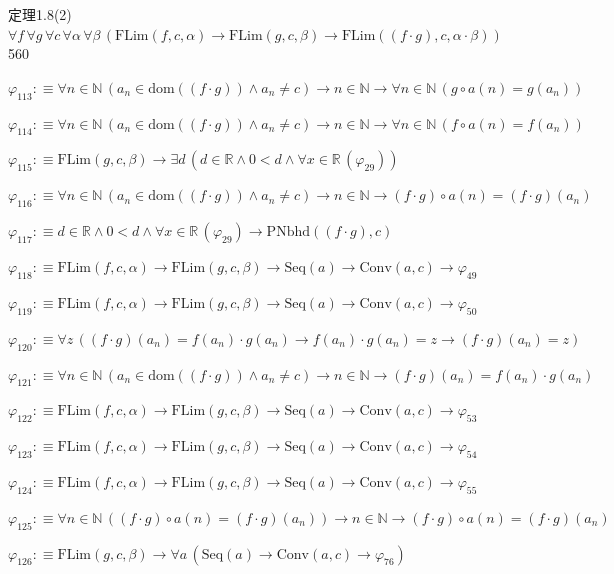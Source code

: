 \begin{fullproof}{定理1.8(2)}{$\forall f\,\forall g\,\forall c\,\forall \alpha\,\forall \beta\,(\mathrm{FLim}(f,c,\alpha) \to \mathrm{FLim}(g,c,\beta) \to \mathrm{FLim}((f \cdot g),c,\alpha \cdot \beta))$}{560}
\begin{abbrevlist}
\item $\varphi_{113} :\equiv \forall n \in \mathbb{N}\,(a_{n} \in \mathrm{dom}((f \cdot g)) \land a_{n} \neq c) \to n \in \mathbb{N} \to \forall n \in \mathbb{N}\,(g \circ a(n) = g(a_{n}))$
\item $\varphi_{114} :\equiv \forall n \in \mathbb{N}\,(a_{n} \in \mathrm{dom}((f \cdot g)) \land a_{n} \neq c) \to n \in \mathbb{N} \to \forall n \in \mathbb{N}\,(f \circ a(n) = f(a_{n}))$
\item $\varphi_{115} :\equiv \mathrm{FLim}(g,c,\beta) \to \exists d\,(d \in \mathbb{R} \land 0 < d \land \forall x \in \mathbb{R}\,(\varphi_{29}))$
\item $\varphi_{116} :\equiv \forall n \in \mathbb{N}\,(a_{n} \in \mathrm{dom}((f \cdot g)) \land a_{n} \neq c) \to n \in \mathbb{N} \to (f \cdot g) \circ a(n) = (f \cdot g)(a_{n})$
\item $\varphi_{117} :\equiv d \in \mathbb{R} \land 0 < d \land \forall x \in \mathbb{R}\,(\varphi_{29}) \to \mathrm{PNbhd}((f \cdot g),c)$
\item $\varphi_{118} :\equiv \mathrm{FLim}(f,c,\alpha) \to \mathrm{FLim}(g,c,\beta) \to \mathrm{Seq}(a) \to \mathrm{Conv}(a,c) \to \varphi_{49}$
\item $\varphi_{119} :\equiv \mathrm{FLim}(f,c,\alpha) \to \mathrm{FLim}(g,c,\beta) \to \mathrm{Seq}(a) \to \mathrm{Conv}(a,c) \to \varphi_{50}$
\item $\varphi_{120} :\equiv \forall z\,((f \cdot g)(a_{n}) = f(a_{n}) \cdot g(a_{n}) \to f(a_{n}) \cdot g(a_{n}) = z \to (f \cdot g)(a_{n}) = z)$
\item $\varphi_{121} :\equiv \forall n \in \mathbb{N}\,(a_{n} \in \mathrm{dom}((f \cdot g)) \land a_{n} \neq c) \to n \in \mathbb{N} \to (f \cdot g)(a_{n}) = f(a_{n}) \cdot g(a_{n})$
\item $\varphi_{122} :\equiv \mathrm{FLim}(f,c,\alpha) \to \mathrm{FLim}(g,c,\beta) \to \mathrm{Seq}(a) \to \mathrm{Conv}(a,c) \to \varphi_{53}$
\item $\varphi_{123} :\equiv \mathrm{FLim}(f,c,\alpha) \to \mathrm{FLim}(g,c,\beta) \to \mathrm{Seq}(a) \to \mathrm{Conv}(a,c) \to \varphi_{54}$
\item $\varphi_{124} :\equiv \mathrm{FLim}(f,c,\alpha) \to \mathrm{FLim}(g,c,\beta) \to \mathrm{Seq}(a) \to \mathrm{Conv}(a,c) \to \varphi_{55}$
\item $\varphi_{125} :\equiv \forall n \in \mathbb{N}\,((f \cdot g) \circ a(n) = (f \cdot g)(a_{n})) \to n \in \mathbb{N} \to (f \cdot g) \circ a(n) = (f \cdot g)(a_{n})$
\item $\varphi_{126} :\equiv \mathrm{FLim}(g,c,\beta) \to \forall a\,(\mathrm{Seq}(a) \to \mathrm{Conv}(a,c) \to \varphi_{76})$

\end{abbrevlist}
\end{fullproof}
